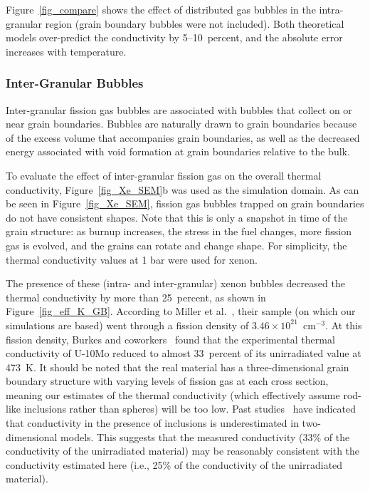 Figure~\ref{fig_compare} shows the effect of distributed gas bubbles in the intra-granular region (grain boundary bubbles were not included). Both theoretical models over-predict the conductivity by 5--10~percent, and the absolute error increases with temperature.

\subsubsection{Inter-Granular Bubbles}
Inter-granular fission gas bubbles are associated with bubbles that collect on
or near grain boundaries. Bubbles are naturally drawn to grain boundaries
because of the excess volume that accompanies grain boundaries, as well as
the decreased energy associated with void formation at grain boundaries
relative to the bulk.

To evaluate the effect of inter-granular fission gas on the overall thermal conductivity, Figure~\ref{fig_Xe_SEM}b was used as the simulation domain. As can be seen in Figure~\ref{fig_Xe_SEM}, fission gas bubbles trapped on grain boundaries do not have consistent shapes. Note that this is only a snapshot in time of the grain structure: as burnup increases, the stress in the fuel changes, more fission gas is evolved, and the grains can rotate and change shape. For simplicity, the thermal conductivity values at 1 bar were used for xenon. 

The presence of these (intra- and inter-granular) xenon bubbles decreased the thermal conductivity by more than 25~percent, as shown in Figure~\ref{fig_eff_K_GB}. According to Miller et al.~\cite{miller2012advantages},
their sample (on which our simulations are based) went through a fission density of $3.46\times10^{21}$~cm$^{-3}$. At this fission density, Burkes and coworkers~\cite{burkes2015thermal} found that the experimental thermal conductivity of U-10Mo reduced to almost 33~percent of its unirradiated value at 473~K\@. It should
be noted that the real material has a three-dimensional grain boundary structure with varying levels of fission gas at each cross section, meaning our estimates of the thermal conductivity (which effectively assume rod-like inclusions rather than spheres) will be too low. Past
studies~\cite{bakker1997using,Schulz1981} have indicated that
conductivity in the presence of inclusions is underestimated in two-dimensional
models. This suggests that the measured conductivity (33\% of the
conductivity of the unirradiated material) may be reasonably consistent with the conductivity estimated here (i.e., 25\% of the conductivity of the unirradiated material).

